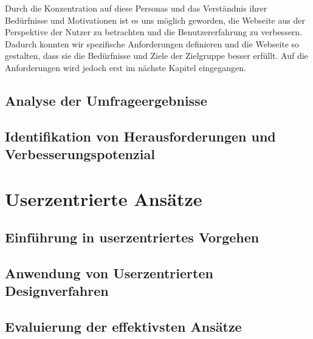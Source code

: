Durch die Konzentration auf diese Personas und das Verständnis ihrer Bedürfnisse und Motivationen ist es uns möglich geworden, die Webseite aus der Perspektive der Nutzer zu betrachten und die Benutzererfahrung zu verbessern. Dadurch konnten wir spezifische Anforderungen definieren und die Webseite so gestalten, dass sie die Bedürfnisse und Ziele der Zielgruppe besser erfüllt. Auf die Anforderungen wird jedoch erst im nächste Kapitel eingegangen.

\subsection{Analyse der Umfrageergebnisse}

\subsection{Identifikation von Herausforderungen und Verbesserungspotenzial}

\section{Userzentrierte Ansätze}

\subsection{Einführung in userzentriertes Vorgehen}

\subsection{Anwendung von Userzentrierten Designverfahren}

\subsection{Evaluierung der effektivsten Ansätze}
